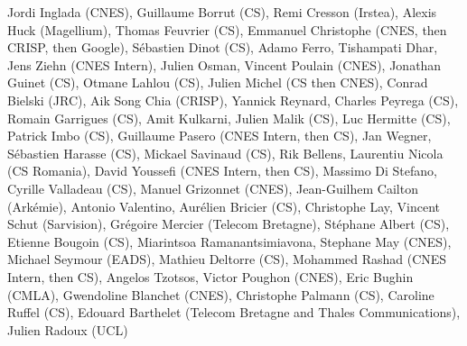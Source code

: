 Jordi Inglada (CNES), Guillaume Borrut (CS), Remi Cresson (Irstea), Alexis Huck (Magellium), Thomas Feuvrier (CS), Emmanuel Christophe (CNES, then CRISP, then Google), S\'ebastien Dinot (CS), Adamo Ferro, Tishampati Dhar, Jens Ziehn (CNES Intern), Julien Osman, Vincent Poulain (CNES), Jonathan Guinet (CS), Otmane Lahlou (CS), Julien Michel (CS then CNES), Conrad Bielski (JRC), Aik Song Chia (CRISP), Yannick Reynard, Charles Peyrega (CS), Romain Garrigues (CS), Amit Kulkarni, Julien Malik (CS), Luc Hermitte (CS), Patrick Imbo (CS), Guillaume Pasero (CNES Intern, then CS), Jan Wegner, S\'ebastien Harasse (CS), Mickael Savinaud (CS), Rik Bellens, Laurentiu Nicola (CS Romania), David Youssefi  (CNES Intern, then CS), Massimo Di Stefano, Cyrille Valladeau (CS), Manuel Grizonnet (CNES), Jean-Guilhem Cailton (Ark\'emie), Antonio Valentino, Aur\'elien Bricier (CS), Christophe Lay, Vincent Schut (Sarvision), Gr\'egoire Mercier (Telecom Bretagne), St\'ephane Albert (CS), Etienne Bougoin (CS), Miarintsoa Ramanantsimiavona, Stephane May (CNES), Michael Seymour (EADS), Mathieu Deltorre (CS), Mohammed Rashad (CNES Intern, then CS), Angelos Tzotsos, Victor Poughon (CNES), Eric Bughin (CMLA), Gwendoline Blanchet (CNES), Christophe Palmann (CS), Caroline Ruffel (CS), Edouard Barthelet (Telecom Bretagne and Thales Communications), Julien Radoux (UCL)